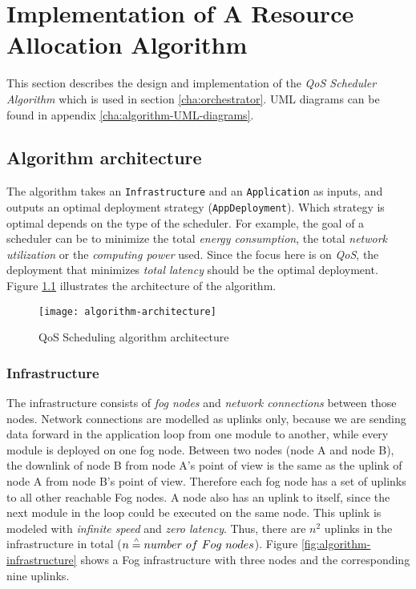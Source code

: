 \chapter{Implementation of A Resource Allocation Algorithm\label{cha:algorithm}}

This section describes the design and implementation of the \textit{QoS Scheduler Algorithm} which is used in section \ref{cha:orchestrator}. UML diagrams can be found in appendix \ref{cha:algorithm-UML-diagrams}.

\section{Algorithm architecture}

The algorithm takes an \texttt{Infrastructure} and an \texttt{Application} as inputs, and outputs an optimal deployment strategy (\texttt{AppDeployment}). Which strategy is optimal depends on the type of the scheduler. For example, the goal of a scheduler can be to minimize the total \textit{energy consumption}, the total \textit{network utilization} or the \textit{computing power} used. Since the focus here is on \textit{QoS}, the deployment that minimizes \textit{total latency} should be the optimal deployment. Figure \ref{fig:algorithm-architecture} illustrates the architecture of the algorithm.

\begin{figure}[h]
    \centering
    \texttt{[image: algorithm-architecture]}
    \caption{QoS Scheduling algorithm architecture}
    \label{fig:algorithm-architecture}
\end{figure}


\subsection{Infrastructure\label{sec:algorithm-infrastructure}}

The infrastructure consists of \textit{fog nodes} and \textit{network connections} between those nodes. Network connections are modelled as uplinks only, because we are sending data forward in the application loop from one module to another, while every module is deployed on one fog node.
Between two nodes (node A and node B), the downlink of node B from node A's point of view is the same as the uplink of node A from node B's point of view. Therefore each fog node has a set of uplinks to all other reachable Fog nodes.
A node also has an uplink to itself, since the next module in the loop could be executed on the same node. This uplink is modeled with \textit{infinite speed} and \textit{zero latency}.
Thus, there are \(n^2\) uplinks in the infrastructure in total ($n \overset{\scriptscriptstyle\wedge}{=} number\ of\ Fog\ nodes$).
Figure \ref{fig:algorithm-infrastructure} shows a Fog infrastructure with three nodes and the corresponding nine uplinks.


